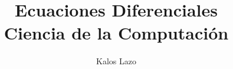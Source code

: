 \documentclass[11pt, A4]{report}
\title{\textbf{Ecuaciones Diferenciales}\\ \large{Ciencia de la Computación}}
\author{Kalos Lazo}
\date{}
\theoremstyle{definition}
\begin{document}
    \onehalfspacing 
    \noindent
    \maketitle
    \tableofcontents

    
    
\end{document}
